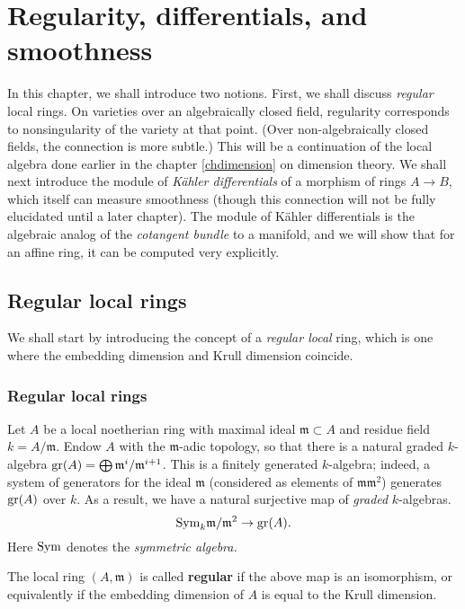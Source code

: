 \chapter{Regularity, differentials, and smoothness}


In this chapter, we shall introduce two notions. First, we shall discuss
\emph{regular} local rings. On varieties over an algebraically closed field,
regularity corresponds to nonsingularity of the variety at that point.
(Over non-algebraically closed fields, the connection is more subtle.) This
will be a continuation of the local algebra done earlier in the chapter
\cref{chdimension}
on dimension theory.
We shall next introduce the module of \emph{K\"ahler differentials} of a
morphism of rings $A \to B$, which itself can measure smoothness (though this
connection will not be fully elucidated until a later chapter).
The module of K\"ahler differentials is the algebraic analog of the
\emph{cotangent bundle} to a manifold, and we will show that for an affine
ring, it can be computed very explicitly.

\section{Regular local rings}
We shall start by introducing the concept of a \emph{regular local} ring, which
is one where the embedding dimension and Krull dimension coincide.
\subsection{Regular local rings}

Let $A$ be a local noetherian ring with maximal ideal $\mathfrak{m} \subset A$
and residue field $k = A/\mathfrak{m}$.
Endow $A$ with the $\mathfrak{m}$-adic topology, so that there is a natural
graded $k$-algebra $\operatorname{gr}(A) = \bigoplus \mathfrak{m}^i/\mathfrak{m}^{i+1}$.
This is a finitely generated $k$-algebra; indeed, a system of generators for
the ideal $\mathfrak{m}$ (considered as elements of
$\mathfrak{m}\mathfrak{m}^2$) generates $\operatorname{gr}(A)$ over $k$.
As a result, we have a natural surjective map of \emph{graded} $k$-algebras.
\begin{equation} \label{reglocringmap} \mathrm{Sym}_k \mathfrak{m}/\mathfrak{m}^2 \to
\operatorname{gr}(A).  \end{equation}
Here $\mathrm{Sym}$ denotes the \emph{symmetric algebra.}
\begin{definition} The local ring $(A, \mathfrak{m})$ is called \textbf{regular} if the above map is
an isomorphism, or equivalently if the embedding dimension of $A$ is equal to
the Krull dimension.
\end{definition}

